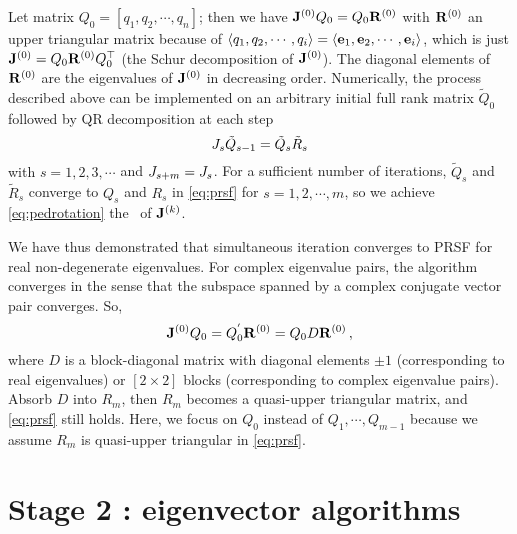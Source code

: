 \documentclass[final,leqno,onefignum,onetabnum]{siamltexmm}
\begin{document}
Let matrix $Q_{0}=[q_{1},q_{2},\cdots ,q_{n}]$; then we have
$\ps{\jMps}{0}Q_{0}=Q_{0}\ps{R}{0}$ with $\ps{R}{0}$ an upper triangular
matrix because of $\langle q_{1},q_{2},\cdots,q_{i} \rangle=\langle
{\jEigvec[1], \jEigvec[2], \cdots,  \jEigvec[i]} \rangle$, which is just
$\ps{\jMps}{0}=Q_{0}\ps{R}{0}Q^\top_{0}$ (the Schur decomposition of
$\ps{\jMps}{0}$). The diagonal elements of $\ps{R}{0}$ are the
eigenvalues of $\ps{\jMps}{0}$ in decreasing order.
Numerically, the process described above can be implemented on an
arbitrary initial full rank matrix $\tilde{Q}_0$ followed by QR
decomposition at
{each step
\begin{equation}
  \label{eq:qr}
  \jMps_{s}\tilde{Q}_{s-1}=\tilde{Q}_{s}\tilde{R}_{s}
\end{equation}
with}
$s=1,2,3,\cdots$ and $\jMps_{s+m}=\jMps_{s}$. For a sufficient number of
iterations, $\tilde{Q}_{s}$ and $\tilde{R}_{s}$ converge to $Q_{s}$ and
$R_{s}$ in \eqref{eq:prsf} for $s=1,2,\cdots,{m}$, so we achieve
\eqref{eq:pedrotation} the \psd\ of $\ps{\jMps}{k}$.

We have thus demonstrated that simultaneous iteration converges to
PRSF for real non-degenerate eigenvalues.
For complex eigenvalue pairs, the algorithm converges in the sense that
the subspace spanned by a complex conjugate vector pair converges. So,
\begin{equation}
  \label{eq:simcplx}
  \ps{\jMps}{0}Q_{0}=Q^{'}_{0}\ps{R}{0}=Q_{0}D\ps{R}{0}
  \,,
\end{equation}
where $D$ is a block-diagonal matrix with diagonal elements $\pm 1$
(corresponding to real eigenvalues) or $[2\!\times\! 2]$ blocks
(corresponding to complex eigenvalue pairs). Absorb $D$ into $R_{m}$,
then $R_{m}$ becomes a quasi-upper triangular matrix, and \eqref{eq:prsf}
still holds.
{Here, we focus on $Q_0$ instead of $Q_1,\cdots,Q_{m-1}$ because we
assume $R_m$ is quasi-upper triangular in \eqref{eq:prsf}}.


\section{Stage 2 : eigenvector algorithms}
\label{sect:eigenvec}
\end{document}
